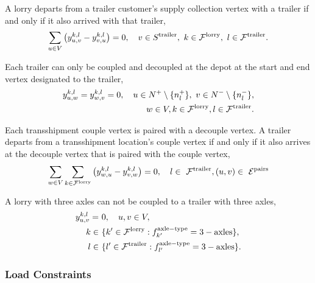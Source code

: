 A lorry departs from a trailer customer's supply collection vertex with a trailer if and only if it also arrived with that trailer,
\begin{align}
   \sum_{u \in V}
   \left(  y^{k,l}_{u,v} - y^{k,l}_{v,u}  \right) =
   0,  \quad  v \in  S^{\rm trailer},
   \ k \in \mathcal F^{\rm lorry},
   \ l \in \mathcal F^{\rm trailer} .
\end{align}


Each trailer can only be coupled and decoupled at the depot at the start and end vertex designated to the trailer,
\begin{align}
     y^{k,l}_{u,w}  = y^{k,l}_{w,v}  =   0, \quad
     u \in N^+ \setminus \{ n^+_l \}, \ v \in N^- \setminus \{ n^-_l \} , \\
     w \in V,
     k \in \mathcal F^{\rm lorry},
     l \in \mathcal F^{\rm trailer}. \notag
\end{align}


Each transshipment couple vertex is paired with a decouple vertex.
A trailer departs from a transshipment location's couple vertex if and only if it also arrives at the decouple vertex that is paired with the couple vertex,
\begin{align}
     \sum_{w \in V}  \sum_{k \in \mathcal F^{\rm lorry} }
     \left( y^{k,l}_{w,u}  - y^{k,l}_{v,w} \right) = 0 , \quad
     l \in \  \mathcal F^{\rm trailer},
      (u,v) \in \ \mathcal E^{\rm pairs}
\end{align}




 A lorry with three axles can not be coupled to a trailer with three axles,
 \begin{align}
   \label{eq:vehicle-compatibility}
   y^{k,l}_{u,v} = \ & 0, \quad u,v \in V ,\\
   k \in \ & \{ k' \in \mathcal{F}^{\rm lorry} : f^{\rm axle-type}_{k'} = {\rm 3-axles} \} , \notag \\
  \ l \in \  & \{ l' \in \mathcal{F}^{\rm trailer} : f^{\rm axle-type}_{l'} = {\rm 3-axles} \} \notag  .
 \end{align}






\subsubsection{Load Constraints}



